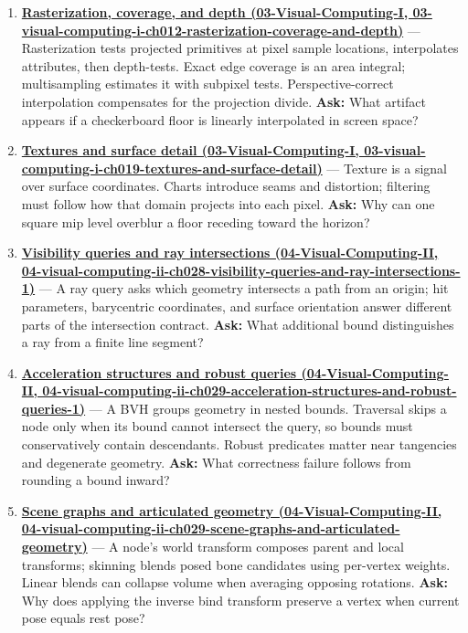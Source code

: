 \begin{enumerate}
\item
  \textbf{\href{../03-Visual-Computing-I/main.pdf\#nameddest=03-visual-computing-i-ch012-rasterization-coverage-and-depth}{Rasterization, coverage, and depth (03-Visual-Computing-I, 03-visual-computing-i-ch012-rasterization-coverage-and-depth)}} --- Rasterization tests projected primitives at pixel sample locations, interpolates attributes, then depth-tests. Exact edge coverage is an area integral; multisampling estimates it with subpixel tests. Perspective-correct interpolation compensates for the projection divide. \textbf{Ask:} What artifact appears if a checkerboard floor is linearly interpolated in screen space?
\item
  \textbf{\href{../03-Visual-Computing-I/main.pdf\#nameddest=03-visual-computing-i-ch019-textures-and-surface-detail}{Textures and surface detail (03-Visual-Computing-I, 03-visual-computing-i-ch019-textures-and-surface-detail)}} --- Texture is a signal over surface coordinates. Charts introduce seams and distortion; filtering must follow how that domain projects into each pixel. \textbf{Ask:} Why can one square mip level overblur a floor receding toward the horizon?
\item
  \textbf{\href{../04-Visual-Computing-II/main.pdf\#nameddest=04-visual-computing-ii-ch028-visibility-queries-and-ray-intersections-1}{Visibility queries and ray intersections (04-Visual-Computing-II, 04-visual-computing-ii-ch028-visibility-queries-and-ray-intersections-1)}} --- A ray query asks which geometry intersects a path from an origin; hit parameters, barycentric coordinates, and surface orientation answer different parts of the intersection contract. \textbf{Ask:} What additional bound distinguishes a ray from a finite line segment?
\item
  \textbf{\href{../04-Visual-Computing-II/main.pdf\#nameddest=04-visual-computing-ii-ch029-acceleration-structures-and-robust-queries-1}{Acceleration structures and robust queries (04-Visual-Computing-II, 04-visual-computing-ii-ch029-acceleration-structures-and-robust-queries-1)}} --- A BVH groups geometry in nested bounds. Traversal skips a node only when its bound cannot intersect the query, so bounds must conservatively contain descendants. Robust predicates matter near tangencies and degenerate geometry. \textbf{Ask:} What correctness failure follows from rounding a bound inward?
\item
  \textbf{\href{../04-Visual-Computing-II/main.pdf\#nameddest=04-visual-computing-ii-ch029-scene-graphs-and-articulated-geometry}{Scene graphs and articulated geometry (04-Visual-Computing-II, 04-visual-computing-ii-ch029-scene-graphs-and-articulated-geometry)}} --- A node's world transform composes parent and local transforms; skinning blends posed bone candidates using per-vertex weights. Linear blends can collapse volume when averaging opposing rotations. \textbf{Ask:} Why does applying the inverse bind transform preserve a vertex when current pose equals rest pose?

\end{enumerate}
